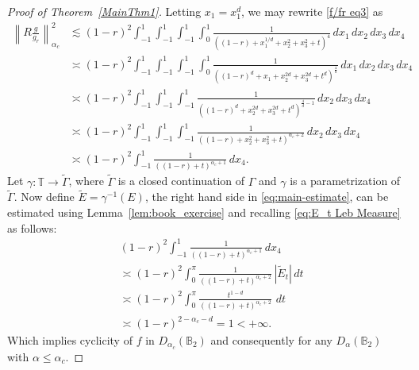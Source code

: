 \documentclass[a4paper,12pt]{amsart}
\theoremstyle{definition}
\theoremstyle{remark}
\def\B{\mathbb{B}}
\begin{document}
\begin{proof} [Proof of Theorem~\ref{MainThm1}]
    Letting \( x_1 = x_1^d \), we may rewrite \eqref{f/fr eq3} as
    \begin{equation}\label{eq:main-estimate}
    \begin{aligned}
    \left\| R \frac{g}{g_r} \right\|_{\alpha_c}^2
    &\lesssim (1 - r)^2 \int_{-1}^1 \int_{-1}^1 \int_{-1}^1 \int_0^1  
    \frac{1}{((1 - r) + x_1^{1/d} + x_2^2 + x_3^2 + t)^{4}} \, dx_1\, dx_2\, dx_3\, dx_4 \\
    &\asymp (1 - r)^2 \int_{-1}^1 \int_{-1}^1 \int_{-1}^1 \int_0^1 
    \frac{1}{((1 - r)^d + x_1  + x_2^{2d} + x_3^{2d} + t^{ d})^{\frac{4}{d}}} \, dx_1\, dx_2\, dx_3\, dx_4 \\
    &\asymp (1 - r)^2 \int_{-1}^1 \int_{-1}^1 \int_{-1}^1
    \frac{1}{((1 - r)^d + x_2^{2 d} + x_3^{2d} + t^{ d})^{\frac{4}{d} - 1}} \, dx_2\, dx_3\, dx_4 \\
    &\asymp (1 - r)^2 \int_{-1}^1 \int_{-1}^1 \int_{-1}^1
    \frac{1}{((1 - r) + x_2^2 + x_3^2 + t)^{\alpha_c + 2}} \, dx_2\, dx_3\, dx_4 \\
    &\asymp (1 - r)^2 \int_{-1}^1
    \frac{1}{((1 - r) + t)^{\alpha_c + 1}} \, dx_4.
    \end{aligned}
    \end{equation}
Let $\gamma: \mathbb{T} \rightarrow \tilde{\Gamma}$, where $\tilde{\Gamma}$ is a closed continuation of $\Gamma$ and $\gamma$ is a parametrization of $\tilde{\Gamma}$. Now define $\tilde{E} = \gamma^{-1}(E)$, the right hand side in \eqref{eq:main-estimate}, can be estimated using Lemma~\ref{lem:book_exercise} and recalling \eqref{eq:E_t Leb Measure} as follows:
\begin{equation}
    \begin{aligned}
        & (1 - r)^2 \int_{-1}^1
    \frac{1}{((1 - r) + t)^{\alpha_c + 1}} \, dx_4 \\
    & \asymp (1 - r)^2 \int_0^{\pi} \frac{1}{((1 - r) + t)^{\alpha_c + 2}}\, |\tilde{E}_t|\, dt \\
    & \asymp (1 - r)^2 \int_0^{\pi} \frac{t^{1-d}}{((1 - r) + t)^{\alpha_c + 2}}\, \, dt \\
    &\asymp (1-r)^{2 - \alpha_c -d} = 1 < + \infty.
    \end{aligned}
\end{equation}
Which implies cyclicity of $f$ in $D_{\alpha_c}(\B_2)$ and consequently for any $D_{\alpha}(\B_2)$ with $\alpha \le \alpha_c$.


\end{proof}
\end{document}
